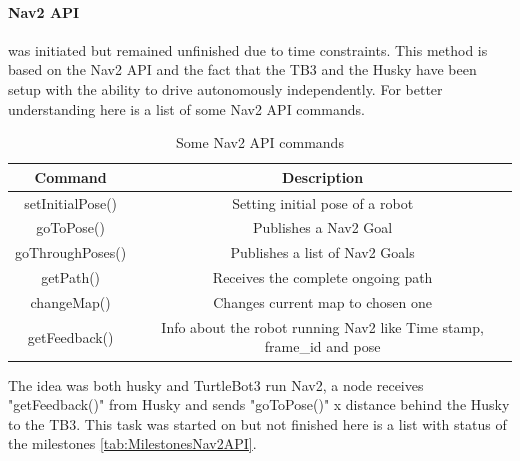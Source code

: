 \paragraph{Nav2 API} was initiated but remained unfinished due to time constraints. This method is based on the Nav2 API and the fact that the TB3 and the Husky have been setup with the ability to drive autonomously independently. For better understanding here is a list of some Nav2 API commands.

\begin{table}[H]
    \centering
    \begin{tabular}{c|c}
        Command             & Description \\ \hline
        setInitialPose()    & Setting initial pose of a robot \\
        goToPose()          & Publishes a Nav2 Goal \\
        goThroughPoses()    & Publishes a list of Nav2 Goals \\
        getPath()           & Receives the complete ongoing path \\
        changeMap()         & Changes current map to chosen one \\
        getFeedback() & Info about the robot running Nav2 like Time stamp, frame\_id and pose\\
    \end{tabular}
    \caption{Some Nav2 API commands\cite{rosnavAPI}}
    \label{tab:Nav2API}
\end{table}

The idea was both husky and TurtleBot3 run Nav2, a node receives "getFeedback()" from Husky and sends "goToPose()" x distance behind the Husky to the TB3. This task was started on but not finished here is a list with status of the milestones \ref{tab:MilestonesNav2API}.

